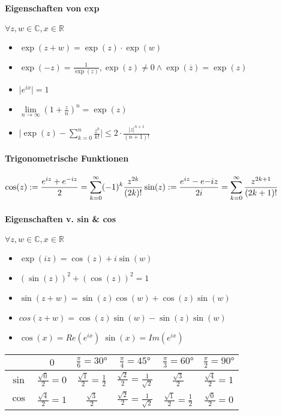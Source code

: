 \documentclass[paper=a4,paper=landscape, fontsize=6pt,DIV=25, twoside]{scrartcl}
\newcommand{\real}{{\mathbb{R}}}
\newcommand{\compl}{\mathbb{C}}
\begin{document}
\begin{multicols*}{4}
		\paragraph{Eigenschaften von exp}
		$\forall z,w \in \compl, x \in \real$
		\begin{itemize}
			\item $\exp(z+w)=\exp(z)\cdot \exp(w)$
			\item $\exp(-z)=\frac{1}{\exp(z)}, \exp(z) \neq 0 \wedge \exp(\overline{z})=\exp(z)$
			\item $\lvert e^{ix} \rvert = 1$
			\item $\lim\limits_{n \rightarrow \infty} (1+\frac{z}{n})^n=\exp(z)$
			\item $\displaystyle \lvert \exp(z)- \sum_{k=0}^{n} \frac{z^k}{k!} \rvert \leq 2 \cdot \frac{\lvert z \rvert ^{n+1}}{(n+1)!}$
		\end{itemize}
			\paragraph{Trigonometrische Funktionen}
			$ \displaystyle \cos(z):=\frac{e^{iz}+e^{-iz}}{2} = \sum_{k=0}^{\infty} (-1)^k\frac{z^{2k}}{(2k)!}\\\sin(z):=\frac{e^{iz}-e{-iz}}{2i} = \sum_{k=0}^{\infty}\frac{z^{2k+1}}{(2k+1)!}$
			\paragraph{Eigenschaften v. sin \& cos}
			$\forall z,w \in \compl, x \in \real$
			\begin{itemize}
				\item $\exp(iz) = \cos(z)+i\sin(w)$
				\item $(\sin(z))^2+(\cos(z))^2=1$
				\item $\sin(z+w)=\sin(z)\cos(w)+\cos(z)\sin(w)$
				\item $cos(z+w)=\cos(z)\sin(w)-\sin(z)\sin(w)$
				\item $\cos(x)=Re(e^{ix}) \; \sin(x)=Im(e^{ix})$
			\end{itemize}
		
			\bgroup
			\def\arraystretch{1.5}
			\begin{tabular}{|c|c|c|c|c|c|}
				\hline
				&$0$&$\frac{\pi}{6}=30°$&$\frac{\pi}{4}=45°$&$\frac{\pi}{3}=60°$&$\frac{\pi}{2}=90°$\\
				\hline
				$\sin$&$\frac{\sqrt{0}}{2}=0$&$\frac{\sqrt{1}}{2}=\frac{1}{2}$&$\frac{\sqrt{2}}{2}=\frac{1}{\sqrt{2}}$&$\frac{\sqrt{3}}{2}$&$\frac{\sqrt{4}}{2}=1$\\
				\hline
				$\cos$&$\frac{\sqrt{4}}{2}=1$&$\frac{\sqrt{3}}{2}$&$\frac{\sqrt{2}}{2}=\frac{1}{\sqrt{2}}$&$\frac{\sqrt{1}}{2}=\frac{1}{2}$&$\frac{\sqrt{0}}{2}=0$\\
				\hline
			\end{tabular}
\end{multicols*}
\end{document}
